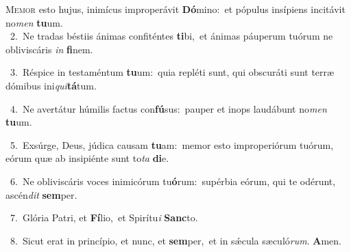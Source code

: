 \lettrine{\initial\textcolor{\initialcolor}{M}}{emor} esto hujus, inimícus improperávit \textbf{Dó}\-mino:~\star et pópulus insípiens incitávit no\textit{men} \textbf{tu}\-um.\\
{\numbfont\textcolor{\numbcolor}{~2.}}~Ne tradas béstiis ánimas confiténtes \textbf{ti}\-bi,~\star et ánimas páuperum tuórum ne obliviscáris \textit{in} \textbf{fi}\-nem.\par
{\numbfont\textcolor{\numbcolor}{~3.}}~Réspice in testaméntum \textbf{tu}\-um:~\star quia repléti sunt, qui obscuráti sunt terræ dómibus ini\-\textit{qui}\-\textbf{tá}tum.\par
{\numbfont\textcolor{\numbcolor}{~4.}}~Ne avertátur húmilis factus con\-\textbf{fú}\-sus:~\star pauper et inops laudábunt no\textit{men} \textbf{tu}\-um.\par
{\numbfont\textcolor{\numbcolor}{~5.}}~Exsúrge, Deus, júdica causam \textbf{tu}\-am:~\star memor esto improperiórum tuórum, eórum quæ ab insipiénte sunt to\textit{ta} \textbf{di}\-e.\par
{\numbfont\textcolor{\numbcolor}{~6.}}~Ne obliviscáris voces inimicórum tu\-\textbf{ó}\-rum:~\star supérbia eórum, qui te odérunt, ascén\textit{dit} \textbf{sem}\-per.\par
{\numbfont\textcolor{\numbcolor}{~7.}}~Glória Patri, et \textbf{Fí}\-lio,~\star et Spirítu\textit{i} \textbf{Sanc}\-to.\par
{\numbfont\textcolor{\numbcolor}{~8.}}~Sicut erat in princípio, et nunc, et \textbf{sem}\-per,~\star et in sǽcula sæculó\-\textit{rum}\-. \textbf{A}\-men.\par
